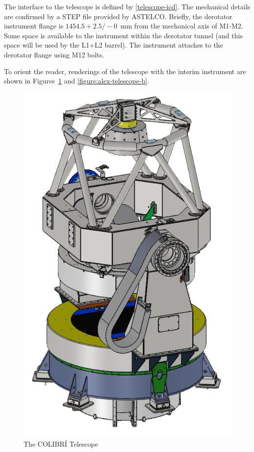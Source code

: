 \documentclass{article}
\begin{document}
The interface to the telescope is defined by \ref{telescope-icd}. The mechanical details are confirmed by a STEP file provided by ASTELCO. Briefly, the derotator instrument flange is $1454.5 +2.5/-0$~mm from the mechanical axis of M1-M2. Some space is available to the instrument within the derotator tunnel (and this space will be used by the L1+L2 barrel). The instrument attaches to the derotator flange using M12 bolts.

To orient the reader, renderings of the telescope with the interim instrument are shown in Figures~\ref{figure:alex-telescope-a} and \ref{figure:alex-telescope-b}.

\begin{figure}
\begin{center}
\includegraphics[width=0.8\linewidth]{newfigures/FigTel.png}
\end{center}
\caption{The COLIBRÍ Telescope}
\label{figure:alex-telescope-a}
\end{figure}
\end{document}
